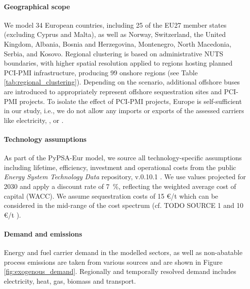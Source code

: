 \documentclass[preprint,12pt,sort&compress]{elsarticle}
\begin{document}
\paragraph{Geographical scope} 
\label{sec:geographical_scope}
We model 34 European countries, including 25 of the EU27 member states (excluding Cyprus and Malta), as well as Norway, Switzerland, the United Kingdom, Albania, Bosnia and Herzegovina, Montenegro, North Macedonia, Serbia, and Kosovo. Regional clustering is based on administrative NUTS boundaries, with higher spatial resolution applied to regions hosting planned PCI-PMI infrastructure, producing 99 onshore regions (see Table \ref{tab:regional_clustering}). Depending on the scenario, additional offshore buses are introduced to appropriately represent offshore sequestration sites and PCI-PMI projects. To isolate the effect of PCI-PMI projects, Europe is self-sufficient in our study, i.e., we do not allow any imports or exports of the assessed carriers like electricity, , or . 

\paragraph{Technology assumptions} 
\label{sec:technology_assumptions}
As part of the PyPSA-Eur model, we source all technology-specific assumptions including lifetime, efficiency, investment and operational costs from the public \textit{Energy System Technology Data} repository, v.0.10.1 \cite{zeyenPyPSATechnologydataV01012025}. We use values projected for 2030 and apply a discount rate of \SI{7}{\percent}, reflecting the weighted average cost of capital (WACC). We assume  sequestration costs of 15 \euro{}/t which can be considered in the mid-range of the cost spectrum (cf. TODO SOURCE 1 and 10 \euro{}/t \cite{hofmannH2CO2Network2025}).

\paragraph{Demand and  emissions}
\label{sec:demand_and_co2_emissions}
Energy and fuel carrier demand in the modelled sectors, as well as non-abatable  process emissions are taken from various sources \cite{mantzosJRCIDEES20152018,eurostatCompleteEnergyBalances2022,manzGeoreferencedIndustrialSites2018,muehlenpfordtTimeSeries2019,krienOemofDemandlibV0222025} and are shown in Figure \ref{fig:exogenous_demand}. Regionally and temporally resolved demand includes electricity, heat, gas, biomass and transport. 
\end{document}

